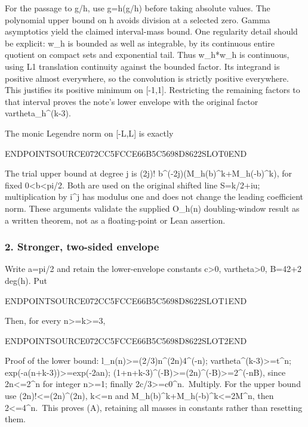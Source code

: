 For the passage to \textbar g/h\textbar, use g=h(g/h) before taking absolute values. The polynomial upper bound on \textbar h\textbar{} avoids division at a selected zero. Gamma asymptotics yield the claimed interval-mass bound. One regularity detail should be explicit: w\_h is bounded as well as integrable, by its continuous entire quotient on compact sets and exponential tail. Thus w\_h*w\_h is continuous, using L1 translation continuity against the bounded factor. Its integrand is positive almost everywhere, so the convolution is strictly positive everywhere. This justifies its positive minimum on {[}-1,1{]}. Restricting the remaining factors to that interval proves the note's lower envelope with the original factor vartheta\_h\^{}(k-3).

The monic Legendre norm on {[}-L,L{]} is exactly

ENDPOINTSOURCE072CC5FCCE66B5C5698D8622SLOT0END

The trial upper bound at degree j is (2j)! b\^{}(-2j)(M\_h(b)\^{}k+M\_h(-b)\^{}k), for fixed 0\textless b\textless pi/2. Both are used on the original shifted line S=k/2+iu; multiplication by i\^{}j has modulus one and does not change the leading coefficient norm. These arguments validate the supplied O\_h(n) doubling-window result as a written theorem, not as a floating-point or Lean assertion.

\subsubsection{2. Stronger, two-sided envelope}\label{endpoint-pr25_norm_original--stronger-two-sided-envelope}

Write a=pi/2 and retain the lower-envelope constants c\textgreater0, vartheta\textgreater0, B=42+2 deg(h). Put

ENDPOINTSOURCE072CC5FCCE66B5C5698D8622SLOT1END

Then, for every n\textgreater=k\textgreater=3,

ENDPOINTSOURCE072CC5FCCE66B5C5698D8622SLOT2END

Proof of the lower bound: l\_n(n)\textgreater=(2/3)n\^{}(2n)4\^{}(-n); vartheta\^{}(k-3)\textgreater=t\^{}n; exp(-a(n+k-3))\textgreater=exp(-2an); (1+n+k-3)\^{}(-B)\textgreater=(2n)\^{}(-B)\textgreater=2\^{}(-nB), since 2n\textless=2\^{}n for integer n\textgreater=1; finally 2c/3\textgreater=c0\^{}n.~Multiply. For the upper bound use (2n)!\textless=(2n)\^{}(2n), k\textless=n and M\_h(b)\^{}k+M\_h(-b)\^{}k\textless=2M\^{}n, then 2\textless=4\^{}n.~This proves (A), retaining all masses in constants rather than resetting them.

